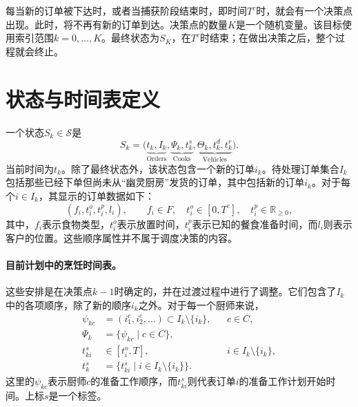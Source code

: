 \documentclass{article}
\begin{document}
每当新的订单被下达时，或者当捕获阶段结束时，即时间\(T^c\)时，就会有一个决策点出现。此时，将不再有新的订单到达。决策点的数量\(K\)是一个随机变量。该目标使用索引范围\(k=0,\ldots,K\)。最终状态为\(S_K\)，在\(T^c\)时结束；在做出决策之后，整个过程就会终止。

\section*{状态与时间表定义}

一个状态\(S_k\in\mathcal{S}\)是
\begin{equation}
S_k=\bigl(\underbrace{t_k,I_k}_{\text{Orders}},
\underbrace{\Psi_k,t^s_k}_{\text{Cooks}},
\underbrace{\Theta_k,t^d_k,t^r_k}_{\text{Vehicles}}\bigr).
\tag{1}
\end{equation}
当前时间为\(t_k\)。除了最终状态外，该状态包含一个新的订单\(i_k\)。待处理订单集合\(I_k\)包括那些已经下单但尚未从“幽灵厨房”发货的订单，其中包括新的订单\(i_k\)。对于每个\(i\in I_k\)，其显示的订单数据如下：
\[
(f_i,t^o_i,t^p_i,l_i),\qquad
f_i\in F,\quad t^o_i\in[0,T^c],\quad t^p_i\in\mathbb{R}_{\geq0},
\]
其中，\(f_i\)表示食物类型，\(t^o_i\)表示放置时间，\(t^p_i\)表示已知的餐食准备时间，而\(l_i\)则表示客户的位置。这些顺序属性并不属于调度决策的内容。

\paragraph{目前计划中的烹饪时间表。}
这些安排是在决策点\(k-1\)时确定的，并在过渡过程中进行了调整。它们包含了\(I_k\)中的各项顺序，除了新的顺序\(i_k\)之外。对于每一个厨师来说，
\begin{align*}
\psi_{kc}&=(i^c_1,i^c_2,\ldots)\subset I_k\setminus\{i_k\}, &&c\in C,\\
\Psi_k&=\{\psi_{kc}\mid c\in C\},\\
t^s_{ki}&\in[t^o_i,T], &&i\in I_k\setminus\{i_k\},\\
t^s_k&=\{t^s_{ki}\mid i\in I_k\setminus\{i_k\}\}.
\end{align*}
这里的\(\psi_{kc}\)表示厨师\(c\)的准备工作顺序，而\(t^s_{ki}\)则代表订单\(i\)的准备工作计划开始时间。上标\(s\)是一个标签。
\end{document}
